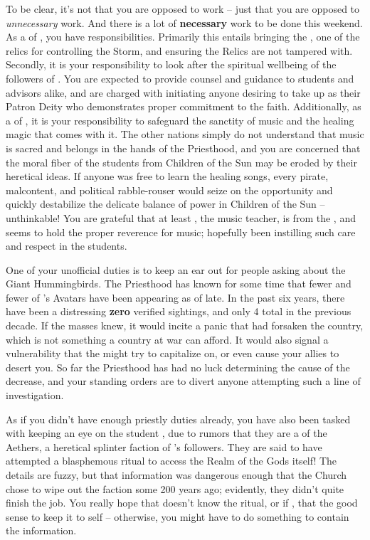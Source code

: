 \documentclass[char]{GL2020}
\begin{document}
To be clear, it's not that you are opposed to work -- just that you are opposed to \emph{unnecessary} work. And there is a lot of \textbf{necessary} work to be done this weekend. As a \cHedonist{\cleric} of \cFarmGod{}, you have responsibilities. Primarily this entails bringing the \iPitcher{}, one of the \pFarm{} relics for controlling the Storm, and ensuring the Relics are not tampered with. Secondly, it is your responsibility to look after the spiritual wellbeing of the followers of \cFarmGod{}. You are expected to provide counsel and guidance to students and advisors alike, and are charged with initiating anyone desiring to take up \cFarmGod{} as their Patron Deity who demonstrates proper commitment to the faith. Additionally, as a \cHedonist{\cleric} of 
\cFarmGod{}, it is your responsibility to safeguard the sanctity of music and the healing magic that comes with it. The other nations simply do not understand that music is sacred and belongs in the hands of the Priesthood, and you are concerned that the moral fiber of the students from Children of the Sun may be eroded by their heretical ideas. If anyone was free to learn the healing songs, every pirate, malcontent, and political rabble-rouser would seize on the opportunity and quickly destabilize the delicate balance of power in Children of the Sun – unthinkable! You are grateful that at least \cMusic{\full}, the music teacher, is from the \pFarm{}, and seems to hold the proper reverence for music; hopefully \cMusic{\they} \cMusic{\have} been instilling such care and respect in the students.

One of your unofficial duties is to keep an ear out for people asking about the Giant Hummingbirds. The Priesthood has known for some time that fewer and fewer of \cFarmGod{}'s Avatars have been appearing as of late. In the past six years, there have been a distressing \textbf{zero} verified sightings, and only 4 total in the previous decade. If the masses knew, it would incite a panic that \cFarmGod{} had forsaken the country, which is not something a country at war can afford. It would also signal a vulnerability that the \pShippies{} might try to capitalize on, or even cause your \pTechies{} allies to desert you. So far the Priesthood has had no luck determining the cause of the decrease, and your standing orders are to divert anyone attempting such a line of investigation.

As if you didn't have enough priestly duties already, you have also been tasked with keeping an eye on the student \cDisney{\full}, due to rumors that they are a \cDisney{\cleric} of the Aethers, a heretical splinter faction of \cFarmGod{}'s followers. They are said to have attempted a blasphemous ritual to access the Realm of the Gods itself! The details are fuzzy, but that information was dangerous enough that the Church chose to wipe out the faction some 200 years ago; evidently, they didn't quite finish the job. You really hope that \cDisney{} doesn't know the ritual, or if \cDisney{\they} \cDisney{\does}, that \cDisney{\they} \cDisney{\have} the good sense to keep it to \cDisney{\them}self – otherwise, you might have to do something to contain the information.
\end{document}
